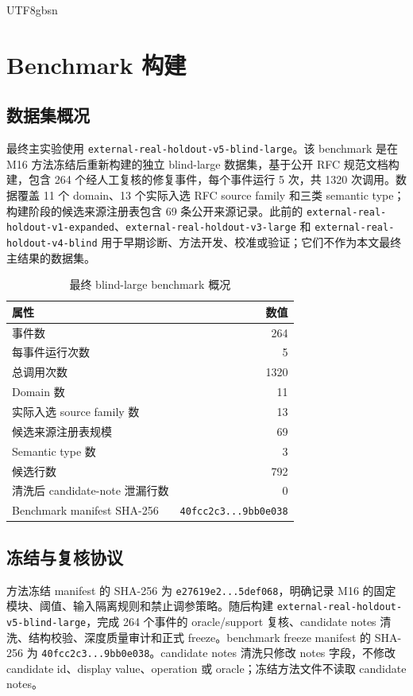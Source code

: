 \documentclass[11pt]{article}
\begin{document}
\begin{CJK*}{UTF8}{gbsn}
\section{Benchmark 构建}

\subsection{数据集概况}

最终主实验使用 \texttt{external-real-holdout-v5-blind-large}。该 benchmark 是在 M16 方法冻结后重新构建的独立 blind-large 数据集，基于公开 RFC 规范文档构建，包含 264 个经人工复核的修复事件，每个事件运行 5 次，共 1320 次调用。数据覆盖 11 个 domain、13 个实际入选 RFC source family 和三类 semantic type；构建阶段的候选来源注册表包含 69 条公开来源记录。此前的 \texttt{external-real-holdout-v1-expanded}、\texttt{external-real-holdout-v3-large} 和 \texttt{external-real-holdout-v4-blind} 用于早期诊断、方法开发、校准或验证；它们不作为本文最终主结果的数据集。

\begin{table}[t]
\centering
\caption{最终 blind-large benchmark 概况}
\label{tab:dataset}
\begin{tabular}{lr}
\toprule
属性 & 数值 \\
\midrule
事件数 & 264 \\
每事件运行次数 & 5 \\
总调用次数 & 1320 \\
Domain 数 & 11 \\
实际入选 source family 数 & 13 \\
候选来源注册表规模 & 69 \\
Semantic type 数 & 3 \\
候选行数 & 792 \\
清洗后 candidate-note 泄漏行数 & 0 \\
Benchmark manifest SHA-256 & \texttt{40fcc2c3...9bb0e038} \\
\bottomrule
\end{tabular}
\end{table}

\subsection{冻结与复核协议}

方法冻结 manifest 的 SHA-256 为 \texttt{e27619e2...5def068}，明确记录 M16 的固定模块、阈值、输入隔离规则和禁止调参策略。随后构建 \texttt{external-real-holdout-v5-blind-large}，完成 264 个事件的 oracle/support 复核、candidate notes 清洗、结构校验、深度质量审计和正式 freeze。benchmark freeze manifest 的 SHA-256 为 \texttt{40fcc2c3...9bb0e038}。candidate notes 清洗只修改 notes 字段，不修改 candidate id、display value、operation 或 oracle；冻结方法文件不读取 candidate notes。


\end{CJK*}
\end{document}
